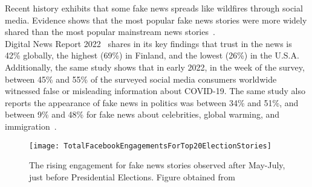 Recent history exhibits that some fake news spreads like wildfires through social media. Evidence shows that the most popular fake news stories were more widely shared than the most popular mainstream news stories~\parencite{Buzzfeed_FakeNewsOutperformRealNews_Silverman}.\\
Digital News Report 2022~\parencite{ReutersInstituteDigitalNewsReport} shares in its key findings that trust in the news is 42\% globally, the highest (69\%) in Finland, and the lowest (26\%) in the U.S.A. Additionally, the same study shows that in early 2022, in the week of the survey, between 45\% and 55\% of the surveyed social media consumers worldwide witnessed false or misleading information about COVID-19. The same study also reports the appearance of fake news in politics was between 34\% and 51\%, and between 9\% and 48\% for fake news about celebrities, global warming, and immigration~\parencite{StatistaUsageOfSocialMedia_Watson}.
\begin{figure}
    \centering
    \texttt{[image: TotalFacebookEngagementsForTop20ElectionStories]}
    \caption[Total Facebook Engagements for Top 20 Election Stories]{The rising engagement for fake news stories observed after May-July, just before Presidential Elections. Figure obtained from~\parencite{Buzzfeed_FakeNewsOutperformRealNews_Silverman}}\label{fig:TotalFacebookEngagementsForTop20ElectionStories}
\end{figure}
